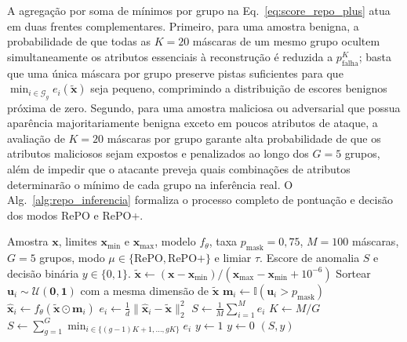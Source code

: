 \documentclass[conference]{IEEEtran}
\begin{document}
A agregação por soma de mínimos por grupo na Eq.~\eqref{eq:score_repo_plus} atua em duas frentes complementares.
Primeiro, para uma amostra benigna, a probabilidade de que todas as $K = 20$ máscaras de um mesmo grupo ocultem simultaneamente os atributos essenciais à reconstrução é reduzida a $p_{\text{falha}}^{K}$; basta que uma única máscara por grupo preserve pistas suficientes para que $\min_{i \in \mathcal{G}_g} e_i(\tilde{\mathbf{x}})$ seja pequeno, comprimindo a distribuição de escores benignos próxima de zero.
Segundo, para uma amostra maliciosa ou adversarial que possua aparência majoritariamente benigna exceto em poucos atributos de ataque, a avaliação de $K = 20$ máscaras por grupo garante alta probabilidade de que os atributos maliciosos sejam expostos e penalizados ao longo dos $G = 5$ grupos, além de impedir que o atacante preveja quais combinações de atributos determinarão o mínimo de cada grupo na inferência real.
O Alg.~\ref{alg:repo_inferencia} formaliza o processo completo de pontuação e decisão dos modos RePO e RePO+.

\begin{algorithm}[!t]
\caption{Inferência Estocástica e Detecção de Anomalias nos Modos RePO e RePO+}
\label{alg:repo_inferencia}
\begin{algorithmic}[1]
\Require Amostra $\mathbf{x}$, limites $\mathbf{x}_{\min}$ e $\mathbf{x}_{\max}$, modelo $f_{\theta}$, taxa $p_{\text{mask}} = 0{,}75$, $M = 100$ máscaras, $G = 5$ grupos, modo $\mu \in \{\text{RePO}, \text{RePO+}\}$ e limiar $\tau$.
\Ensure Escore de anomalia $S$ e decisão binária $y \in \{0, 1\}$.
\State $\tilde{\mathbf{x}} \gets (\mathbf{x} - \mathbf{x}_{\min}) / (\mathbf{x}_{\max} - \mathbf{x}_{\min} + 10^{-6})$
    \State Sortear $\mathbf{u}_i \sim \mathcal{U}(\mathbf{0}, \mathbf{1})$ com a mesma dimensão de $\tilde{\mathbf{x}}$
    \State $\mathbf{m}_i \gets \mathbb{I}(\mathbf{u}_i > p_{\text{mask}})$
    \State $\hat{\mathbf{x}}_i \gets f_{\theta}(\tilde{\mathbf{x}} \odot \mathbf{m}_i)$
    \State $e_i \gets \frac{1}{d} \|\hat{\mathbf{x}}_i - \tilde{\mathbf{x}}\|_2^2$
\EndFor
{}
    \State $S \gets \frac{1}{M} \sum_{i=1}^{M} e_i$
\Else
    \State $K \gets M / G$
    \State $S \gets \sum_{g=1}^{G} \min_{i \in \{(g-1)K+1, \dots, gK\}} e_i$
\EndIf
{}
    \State $y \gets 1$ 
\Else
    \State $y \gets 0$ 
\EndIf
\State \Return $(S, y)$
\end{algorithmic}
\end{algorithm}
\end{document}
